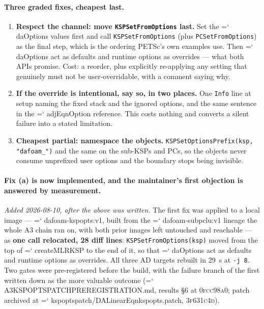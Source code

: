 \documentclass[11pt,a4paper]{article}
\newcommand{\artifact}[1]{{\small\ttfamily\hyphenchar\font=`\-\relax
  \def\_{\textunderscore\allowbreak}#1}}
\newcommand{\commit}[1]{\textsc{\small #1}}
\begin{document}
\paragraph{Three graded fixes, cheapest last.}
\begin{enumerate}
\item \textbf{Respect the channel: move \texttt{KSPSetFromOptions} last.} Set the
\artifact{daOptions} values first and call \texttt{KSPSetFromOptions} (plus
\texttt{PCSetFromOptions}) as the final step, which is the ordering PETSc's own examples use.
Then \artifact{daOptions} act as defaults and runtime options as overrides --- what both APIs
promise. Cost: a reorder, plus explicitly re-applying any setting that genuinely must not be
user-overridable, with a comment saying why.
\item \textbf{If the override is intentional, say so, in two places.} One \texttt{Info} line at
setup naming the fixed stack and the ignored options, and the same sentence in the
\artifact{adjEqnOption} reference. This costs nothing and converts a silent failure into a
stated limitation.
\item \textbf{Cheapest partial: namespace the objects.}
\texttt{KSPSetOptionsPrefix(ksp, "dafoam\_")} and the same on the sub-KSPs and PCs, so the
objects never consume unprefixed user options and the boundary stops being invisible.
\end{enumerate}

\paragraph{Fix (a) is now implemented, and the maintainer's first objection is answered by
measurement.} \emph{Added 2026-08-10, after the above was written.} The first fix was applied to a
local image --- \artifact{dafoam-kspopts:v1}, built from the \artifact{dafoam-subpclu:v1} lineage
the whole A3 chain ran on, with both prior images left untouched and reachable --- as \textbf{one
call relocated, 28 diff lines}: \texttt{KSPSetFromOptions(ksp)} moved from the top of
\artifact{createMLRKSP} to the end of it, so that \artifact{daOptions} act as defaults and runtime
options as overrides. All three AD targets rebuilt in 29~s at \texttt{-j 8}. Two gates were
pre-registered before the build, with the failure branch of the first written down as the more
valuable outcome (\artifact{A3\_KSPOPTS\_PATCH\_PREREGISTRATION.md}, results \S6 at
\commit{0fcc98a0}; patch archived at
\artifact{kspopts\_patch/DALinearEqn\_kspopts.patch}, \commit{3f631c4d}).
\end{document}
